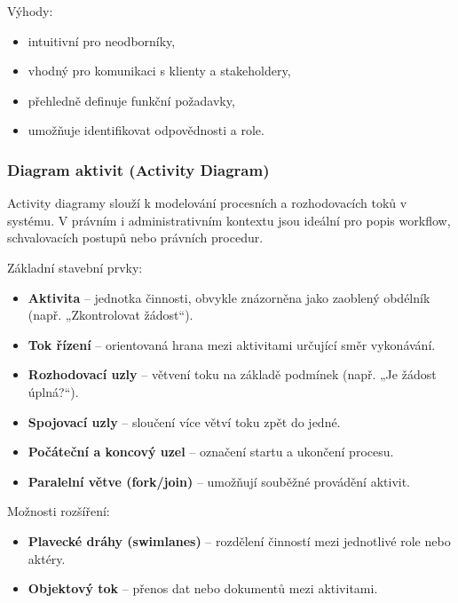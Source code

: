 Výhody:
\begin{itemize}
  \item intuitivní pro neodborníky,
  \item vhodný pro komunikaci s klienty a stakeholdery,
  \item přehledně definuje funkční požadavky,
  \item umožňuje identifikovat odpovědnosti a role. \cite{Mlejnek2020UseCase,Benabderrezak2024UseCase}
\end{itemize}


\subsubsection{Diagram aktivit (Activity Diagram)}
\label{sec:activity-diagram}

Activity diagramy slouží k modelování procesních a rozhodovacích toků v systému. V právním i administrativním kontextu jsou ideální pro popis workflow, schvalovacích postupů nebo právních procedur. \cite{PerglUML,Mlejnek2020Activity}

Základní stavební prvky:
\begin{itemize}
  \item \textbf{Aktivita} – jednotka činnosti, obvykle znázorněna jako zaoblený obdélník (např. „Zkontrolovat žádost“).
  \item \textbf{Tok řízení} – orientovaná hrana mezi aktivitami určující směr vykonávání.
  \item \textbf{Rozhodovací uzly} – větvení toku na základě podmínek (např. „Je žádost úplná?“).
  \item \textbf{Spojovací uzly} – sloučení více větví toku zpět do jedné.
  \item \textbf{Počáteční a koncový uzel} – označení startu a ukončení procesu.
  \item \textbf{Paralelní větve (fork/join)} – umožňují souběžné provádění aktivit.
\end{itemize}

Možnosti rozšíření:
\begin{itemize}
  \item \textbf{Plavecké dráhy (swimlanes)} – rozdělení činností mezi jednotlivé role nebo aktéry.
  \item \textbf{Objektový tok} – přenos dat nebo dokumentů mezi aktivitami.
\end{itemize}

